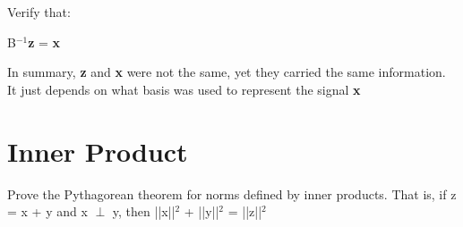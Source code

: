 \documentclass[11pt]{article}
\begin{document}
\vspace{4mm}
Verify that:

\begin{center}

B$^{-1}$\textbf{z} = \textbf{x}

\end{center}

\vspace{10mm}
In summary, \textbf{z} and \textbf{x} were not the same, yet they carried the same information. It just depends on what basis was used to represent the signal \textbf{x}


\vspace{5mm}
\section{Inner Product}
Prove the Pythagorean theorem for norms defined by inner products. That is, if z = x + y and \newline
x $\perp$ y, then ||x||$^2$ + ||y||$^2$ = ||z||$^2$
\end{document}
